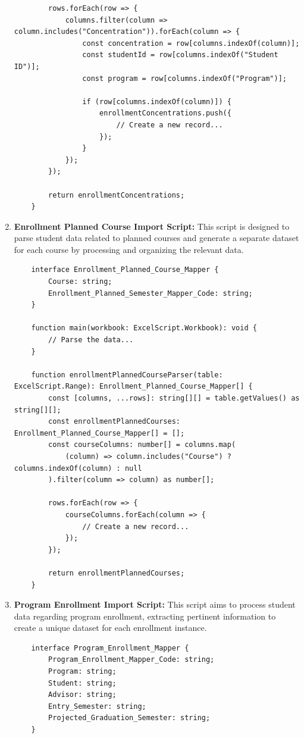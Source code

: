 \documentclass[12pt]{article}
\begin{document}
\begin{enumerate}[label=(\roman*)]
\begin{lstlisting}
        rows.forEach(row => {
            columns.filter(column => column.includes("Concentration")).forEach(column => {
                const concentration = row[columns.indexOf(column)];
                const studentId = row[columns.indexOf("Student ID")];
                const program = row[columns.indexOf("Program")];

                if (row[columns.indexOf(column)]) {
                    enrollmentConcentrations.push({
                        // Create a new record...
                    });
                }
            });
        });

        return enrollmentConcentrations;
    }
    \end{lstlisting}

    \item \textbf{Enrollment Planned Course Import Script:} This script is designed to parse student data related to planned courses and generate a separate dataset for each course by processing and organizing the relevant data.
    \begin{lstlisting}
    interface Enrollment_Planned_Course_Mapper {
        Course: string;
        Enrollment_Planned_Semester_Mapper_Code: string;
    }
    
    function main(workbook: ExcelScript.Workbook): void {
        // Parse the data...
    }
    
    function enrollmentPlannedCourseParser(table: ExcelScript.Range): Enrollment_Planned_Course_Mapper[] {
        const [columns, ...rows]: string[][] = table.getValues() as string[][];
        const enrollmentPlannedCourses: Enrollment_Planned_Course_Mapper[] = [];
        const courseColumns: number[] = columns.map(
            (column) => column.includes("Course") ? columns.indexOf(column) : null
        ).filter(column => column) as number[];
    
        rows.forEach(row => {
            courseColumns.forEach(column => {
                // Create a new record...
            });
        });
    
        return enrollmentPlannedCourses;
    }        
    \end{lstlisting}

    \item \textbf{Program Enrollment Import Script:} This script aims to process student data regarding program enrollment, extracting pertinent information to create a unique dataset for each enrollment instance.
    \begin{lstlisting}
    interface Program_Enrollment_Mapper {
        Program_Enrollment_Mapper_Code: string;
        Program: string;
        Student: string;
        Advisor: string;
        Entry_Semester: string;
        Projected_Graduation_Semester: string;
    }
    

\end{lstlisting}
\end{enumerate}
\end{document}
